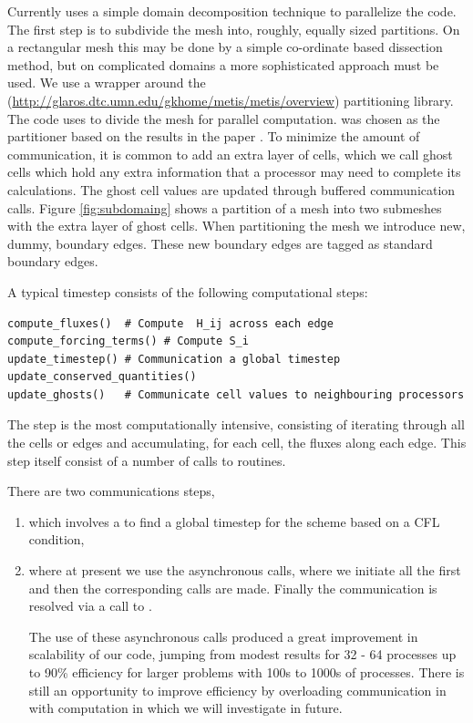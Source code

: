 \documentclass{manual}
\begin{document}
Currently \anuga uses a simple domain decomposition technique to parallelize the code. 
The first step is to subdivide the mesh
into, roughly, equally sized partitions. On a rectangular mesh this may be
done by a simple co-ordinate based dissection method, but on  complicated
domains a more sophisticated approach must be used.  We use a
\Python{} wrapper around the \Metis{}
(\url{http://glaros.dtc.umn.edu/gkhome/metis/metis/overview})
partitioning library. The code uses \Metis{} to divide the mesh for
parallel computation. \Metis{} was chosen as the partitioner based on
the results in the paper \cite{karypis1999fast}.
To minimize the amount of communication, it is common to add an
extra layer of cells, which we call ghost cells which hold any extra information that
a processor may need to complete its calculations. The ghost
cell values are updated through buffered communication calls. Figure
\ref{fig:subdomaing} shows a partition of a mesh into two submeshes  with the extra layer of
ghost cells.
When partitioning the mesh we introduce new, dummy, boundary edges.
These new
boundary edges are  tagged as  standard boundary edges.


A typical timestep consists of the following computational steps:
\begin{verbatim}
compute_fluxes()  # Compute  H_ij across each edge
compute_forcing_terms() # Compute S_i
update_timestep() # Communication a global timestep
update_conserved_quantities() 
update_ghosts()   # Communicate cell values to neighbouring processors
\end{verbatim}

The  step is the most computationally intensive, consisting of iterating through all the cells or edges and accumulating, for each cell,  the fluxes along each edge.  This step itself consist of a number of calls to \Python{} routines. 


There are two communications steps, 
\begin{enumerate}[(1)]
\item  {} which involves a  to find a global timestep for the scheme based on a CFL condition,

\item {} where at present we use the asynchronous  \MPI{}  calls, where we initiate all the   first and then the corresponding  calls are made.  Finally the communication is resolved via a call to . 

The use of these asynchronous \MPI{} calls produced a great improvement in scalability of our code, jumping from modest results for 32 - 64 \MPI{} processes up to 90\% efficiency for larger problems with 100s to 1000s of \MPI{} processes. There is still an opportunity to improve efficiency by overloading communication in   with computation in  which we will investigate in future. 
\end{enumerate}
\end{document}
